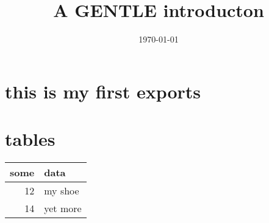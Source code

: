 \documentclass[11pt]{article}
\date{\today}
\title{A GENTLE  introducton}
\begin{document}
\maketitle
\tableofcontents

\section{this is my first exports}
\label{sec:org509ea1e}
\section{tables}
\label{sec:orgd1c5237}
\begin{center}
\begin{tabular}{rl}
some & data\\
\hline
12 & my shoe\\
14 & yet more\\
\end{tabular}
\end{center}
\end{document}
